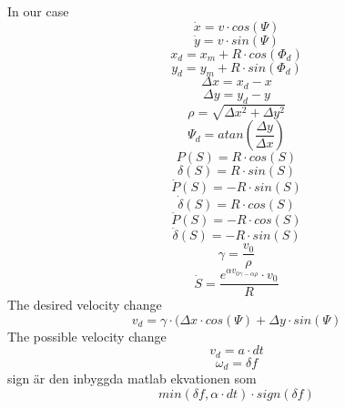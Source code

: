 \documentclass{article}
\begin{document}
In our case
\begin{equation}
\dot{x} = v \cdot cos(\Psi)
\end{equation}
\begin{equation}
\dot{y} = v \cdot sin(\Psi)
\end{equation}
\begin{equation}
x_{d} = x_{m} + R \cdot cos(\Phi_{d})
\end{equation}
\begin{equation}
y_{d} = y_{m} + R \cdot sin(\Phi_{d})
\end{equation}
\begin{equation}
\Delta x = x_{d} - x 
\end{equation}
\begin{equation}
\Delta y = y_{d} - y
\end{equation}
\begin{equation}
\rho = \sqrt{\Delta x^2 + \Delta y^2}
\end{equation}
\begin{equation}
\Psi_{d} = atan(\frac{\Delta y}{\Delta x})
\end{equation}
\begin{equation}
P(S) = R \cdot cos(S)
\end{equation}
\begin{equation}
\delta(S) = R \cdot sin(S)
\end{equation}
\begin{equation}
\dot{P}(S) = -R \cdot sin(S)
\end{equation}
\begin{equation}
\dot{\delta}(S) = R \cdot cos(S)
\end{equation}
\begin{equation}
\ddot{P}(S) = -  R \cdot cos(S)
\end{equation}
\begin{equation}
\ddot{\delta}(S) = -  R \cdot sin(S)
\end{equation}
\begin{equation}
\gamma = \frac{v_{0}}{\rho}
\end{equation}
\begin{equation}
\dot{S} = \frac{e^{\alpha v_{0 \gamma - \alpha \rho}} \cdot v_{0}}{R}
\end{equation}
The desired velocity change
\begin{equation}
v_{d} = \gamma \cdot(\Delta x \cdot cos(\Psi) + \Delta y \cdot sin(\Psi)
\end{equation}
The possible velocity change
\begin{equation}
v_{d} = a \cdot dt
\end{equation}
\begin{equation}
\omega_{d} = \delta f
\end{equation}
sign är den inbyggda matlab ekvationen som 
\begin{equation}
min(\delta f , \alpha \cdot dt) \cdot sign(\delta f)
\end{equation}
\end{document}
